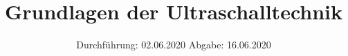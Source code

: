 

\subject{US1}
\title{Grundlagen der Ultraschalltechnik}
\date{%
  Durchführung: 02.06.2020
  \hspace{3em}
  Abgabe: 16.06.2020
}



\maketitle
\thispagestyle{empty}
\tableofcontents
\newpage







\printbibliography{}



